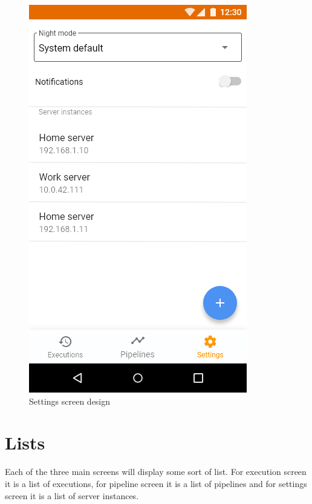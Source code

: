 \begin{figure}
\begin{minipage}[b]{0.32\textwidth}
    	\includegraphics[width=\textwidth]{pics/xd/Bottom Navigation - settings.png}
    	\caption[Settings]{Settings screen design}\label{fig:xdSettings}
    \end{minipage}
\end{figure}

\section{Lists}
Each of the three main screens will display some sort of list.
For execution screen it is a list of executions, for pipeline screen it is a list of pipelines and for settings screen it is a list of server instances.


